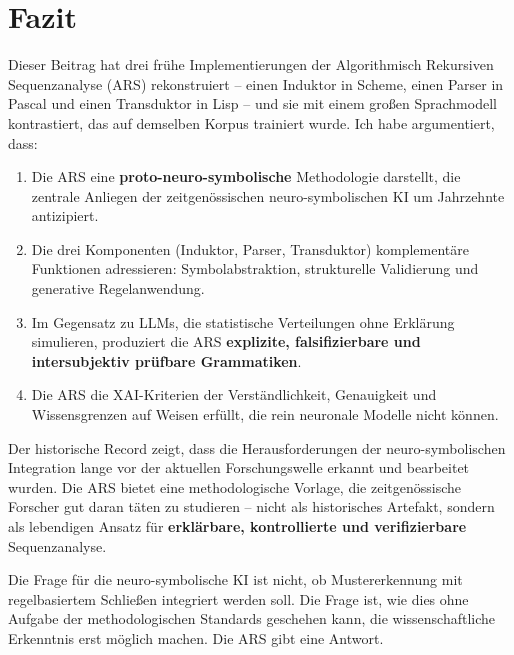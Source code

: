\documentclass[12pt,a4paper]{article}
\begin{document}
\section{Fazit}

Dieser Beitrag hat drei frühe Implementierungen der Algorithmisch Rekursiven 
Sequenzanalyse (ARS) rekonstruiert – einen Induktor in Scheme, einen Parser 
in Pascal und einen Transduktor in Lisp – und sie mit einem großen Sprachmodell 
kontrastiert, das auf demselben Korpus trainiert wurde. Ich habe argumentiert, 
dass:

\begin{enumerate}
    \item Die ARS eine \textbf{proto-neuro-symbolische} Methodologie darstellt, 
    die zentrale Anliegen der zeitgenössischen neuro-symbolischen KI um 
    Jahrzehnte antizipiert.
    
    \item Die drei Komponenten (Induktor, Parser, Transduktor) komplementäre 
    Funktionen adressieren: Symbolabstraktion, strukturelle Validierung und 
    generative Regelanwendung.
    
    \item Im Gegensatz zu LLMs, die statistische Verteilungen ohne Erklärung 
    simulieren, produziert die ARS \textbf{explizite, falsifizierbare und 
    intersubjektiv prüfbare Grammatiken}.
    
    \item Die ARS die XAI-Kriterien der Verständlichkeit, Genauigkeit und 
    Wissensgrenzen auf Weisen erfüllt, die rein neuronale Modelle nicht können.
\end{enumerate}

Der historische Record zeigt, dass die Herausforderungen der neuro-symbolischen 
Integration lange vor der aktuellen Forschungswelle erkannt und bearbeitet 
wurden. Die ARS bietet eine methodologische Vorlage, die zeitgenössische 
Forscher gut daran täten zu studieren – nicht als historisches Artefakt, sondern 
als lebendigen Ansatz für \textbf{erklärbare, kontrollierte und verifizierbare} 
Sequenzanalyse.

Die Frage für die neuro-symbolische KI ist nicht, ob Mustererkennung mit 
regelbasiertem Schließen integriert werden soll. Die Frage ist, wie dies ohne 
Aufgabe der methodologischen Standards geschehen kann, die wissenschaftliche 
Erkenntnis erst möglich machen. Die ARS gibt eine Antwort.
\end{document}
